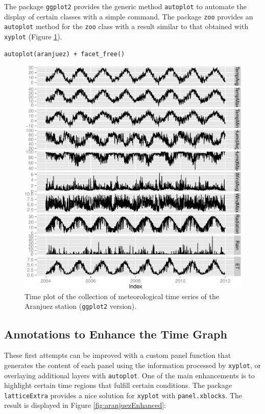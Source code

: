 \documentclass[smallroyalvopaper]{memoir}
\begin{document}
The package \texttt{ggplot2} provides the generic method \texttt{autoplot} to
automate the display of certain classes with a simple command. The
package \texttt{zoo} provides an \texttt{autoplot} method for the \texttt{zoo} class with a
result similar to that obtained with \texttt{xyplot} (Figure \ref{fig:aranjuezNaiveGG}).

\lstset{language=R,numbers=none}
\begin{lstlisting}
autoplot(aranjuez) + facet_free()
\end{lstlisting}

\begin{figure}[htb]
\centering
\includegraphics[width=.9\linewidth]{figs/aranjuezGG.pdf}
\caption{\label{fig:aranjuezNaiveGG}Time plot of the collection of meteorological time series of the Aranjuez station (\texttt{ggplot2} version).}
\end{figure}

\subsection{\floweroneleft Annotations to Enhance the Time Graph}
\label{sec-1-1}

These first attempts can be improved with a custom panel function
that generates the content of each panel using the information
processed by \texttt{xyplot}, or overlaying additional layers with
\texttt{autoplot}.  One of the main enhancements is to highlight certain time
regions that fulfill certain conditions. The package \texttt{latticeExtra}
provides a nice solution for \texttt{xyplot} with \texttt{panel.xblocks}. The result
is displayed in Figure \ref{fig:aranjuezEnhanced}:
\end{document}
